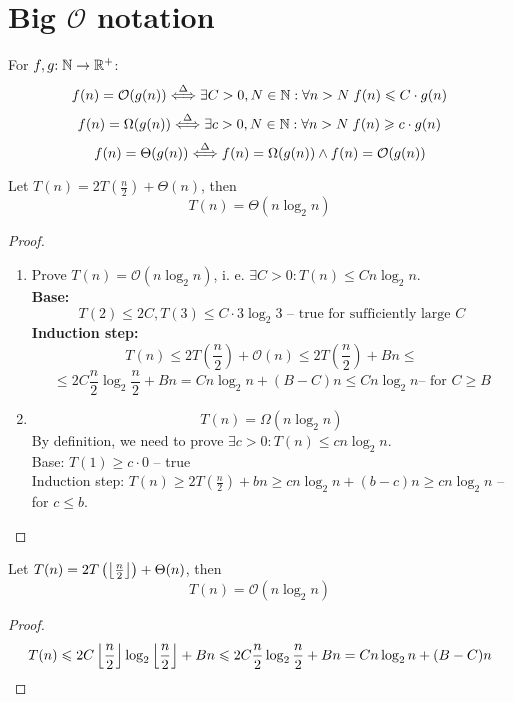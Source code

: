 \section{Big $\mathcal{O}$ notation}

\begin{definition}
    For $f, g{:}\; \mathbb{N} \rightarrow \mathbb{R}^{+}$:
    \[ f(n) = \mathcal{O}(g(n)) \stackrel{\Delta}{\Longleftrightarrow} \exists C > 0, N \in \mathbb{N}: \forall n > N \; f(n) \leqslant C \cdot g(n) \]
    \[ f(n) = \Omega(g(n)) \stackrel{\Delta}{\Longleftrightarrow} \exists c > 0, N \in \mathbb{N}: \forall n > N \; f(n) \geqslant c \cdot g(n) \]
    \[ f(n) = \Theta(g(n)) \stackrel{\Delta}{\Longleftrightarrow} f(n) = \Omega(g(n)) \wedge f(n) = \mathcal{O}(g(n)) \]
\end{definition}

\begin{example}
    Let $T(n) = 2 T(\frac{n}{2}) + \Theta(n)$, then
    \[ T(n) = \Theta(n \log_2{n}) \]
\end{example}
\begin{proof}\phantom\\
\begin{enumerate}
\item
    Prove $T(n) = \mathcal{O}(n \log_2{n})$, i. e. $\exists C > 0 : T(n) \le Cn \log_2{n}$. \\
    \textbf{Base:}
        \[ T(2) \le 2C, T(3) \le C \cdot 3 \log_2{3} \text{ -- true for sufficiently large $C$} \]
    \textbf{Induction step:}
        \[
            T(n) \le
            2 T(\frac{n}{2}) + \mathcal{O}(n) \le
            2 T(\frac{n}{2}) + B n \le
        \]\[
            \le 2 C \frac{n}{2} \log_2{\frac{n}{2}} + Bn =
            C n \log_2{n} + (B - C)n \le C n \log_2{n}
            \text{-- for $C \ge B$}
        \]
\item
    \[ T(n) = \Omega(n \log_2{n}) \]
    By definition, we need to prove $\exists c > 0 : T(n) \le cn \log_2{n}$. \\
    Base: $T(1) \ge c \cdot 0$ -- true \\
    Induction step: $T(n) \ge 2T(\frac{n}{2}) + bn \ge cn \log_2{n} + (b - c) n \ge cn \log_2{n} $ -- for $c \le b$.
\end{enumerate}
\end{proof}

\begin{example}
    Let $T(n) = 2 T\left(\left\lfloor\frac n 2\right\rfloor\right) + \Theta(n)$, then
    \[ T(n) = \mathcal{O}(n \log_2 n) \]
\end{example}
\begin{proof}
    \[ T(n) \leqslant 2C \left\lfloor\frac n 2\right\rfloor \log_2 \left\lfloor\frac n 2\right\rfloor + Bn \leqslant 2C \frac n 2 \log_2 \frac n 2 + Bn = C n \log_2 n + (B - C)n  \]
\end{proof}


